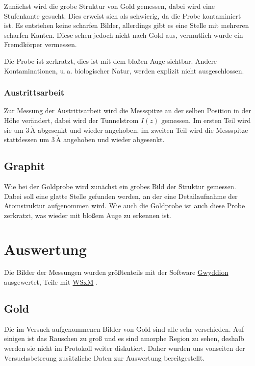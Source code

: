\documentclass[12pt,a4paper]{scrartcl}
\numberwithin{equation}{section} %
\begin{document}
Zunächst wird die grobe Struktur von Gold gemessen, dabei wird eine Stufenkante gesucht. Dies erweist sich als schwierig, da die Probe kontaminiert ist. Es entstehen keine scharfen Bilder, allerdings gibt es eine Stelle mit mehreren scharfen Kanten. Diese sehen jedoch nicht nach Gold aus, vermutlich wurde ein Fremdkörper vermessen.

Die Probe ist zerkratzt, dies ist mit dem bloßen Auge sichtbar. Andere Kontaminationen, u.\,a. biologischer Natur, werden explizit nicht ausgeschlossen.

\hypertarget{austrittsarbeit}{%
\subsubsection{Austrittsarbeit}\label{austrittsarbeit}}

Zur Messung der Austrittsarbeit wird die Messspitze an der selben Position in der Höhe verändert, dabei wird der Tunnelstrom $I(z)$ gemessen. Im ersten Teil wird sie um $3\,\mathrm{\mathring{A}}$ abgesenkt und wieder angehoben, im zweiten Teil wird die Messspitze stattdessen um $3\,\mathrm{\mathring{A}}$ angehoben und wieder abgesenkt.

\hypertarget{graphit}{%
\subsection{Graphit}\label{graphit}}

Wie bei der Goldprobe wird zunächst ein grobes Bild der Struktur gemessen. Dabei soll eine glatte Stelle gefunden werden, an der eine Detailaufnahme der Atomstruktur aufgenommen wird. Wie auch die Goldprobe ist auch diese Probe zerkratzt, was wieder mit bloßem Auge zu erkennen ist.

\clearpage
\hypertarget{auswertung}{%
\section{Auswertung}\label{auswertung}}
Die Bilder der Messungen wurden größtenteils mit der Software \href{http://gwyddion.net}{Gwyddion} \cite{Gwyddion} ausgewertet, Teile mit \href{http://www.wsxm.eu}{WSxM} \cite{WSxM}.

\hypertarget{gold-1}{%
\subsection{Gold}\label{gold-1}}

Die im Versuch aufgenommenen Bilder von Gold sind alle sehr verschieden. Auf einigen ist das Rauschen zu groß und es sind amorphe Region zu sehen, deshalb werden sie nicht im Protokoll weiter diskutiert. Daher wurden uns vonseiten der Versuchsbetreung zusätzliche Daten zur Auswertung bereitgestellt. \cite{Grover}
\end{document}
